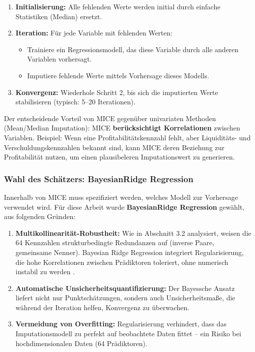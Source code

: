 \begin{enumerate}[topsep=0.2\baselineskip]
    \item \textbf{Initialisierung:} Alle fehlenden Werte werden initial durch einfache Statistiken (Median) ersetzt.
    \item \textbf{Iteration:} Für jede Variable mit fehlenden Werten:
    \begin{itemize}
        \item Trainiere ein Regressionsmodell, das diese Variable durch alle anderen Variablen vorhersagt.
        \item Imputiere fehlende Werte mittels Vorhersage dieses Modells.
    \end{itemize}
    \item \textbf{Konvergenz:} Wiederhole Schritt 2, bis sich die imputierten Werte stabilisieren (typisch: 5--20 Iterationen).
\end{enumerate}

Der entscheidende Vorteil von MICE gegenüber univariaten Methoden (Mean/Median Imputation): MICE \textbf{berücksichtigt Korrelationen} zwischen Variablen. Beispiel: Wenn eine Profitabilitätskennzahl fehlt, aber Liquiditäts- und Verschuldungskennzahlen bekannt sind, kann MICE deren Beziehung zur Profitabilität nutzen, um einen plausibeleren Imputationswert zu generieren.

\subsubsection{Wahl des Schätzers: BayesianRidge Regression}

Innerhalb von MICE muss spezifiziert werden, welches Modell zur Vorhersage verwendet wird. Für diese Arbeit wurde \textbf{BayesianRidge Regression} gewählt, aus folgenden Gründen:

\begin{enumerate}[topsep=0.2\baselineskip]
    \item \textbf{Multikollinearität-Robustheit:} Wie in Abschnitt 3.2 analysiert, weisen die 64 Kennzahlen strukturbedingte Redundanzen auf (inverse Paare, gemeinsame Nenner). Bayesian Ridge Regression integriert Regularisierung, die hohe Korrelationen zwischen Prädiktoren toleriert, ohne numerisch instabil zu werden \parencite{tipping2001sparse}.
    \item \textbf{Automatische Unsicherheitsquantifizierung:} Der Bayessche Ansatz liefert nicht nur Punktschätzungen, sondern auch Unsicherheitsmaße, die während der Iteration helfen, Konvergenz zu überwachen.
    \item \textbf{Vermeidung von Overfitting:} Regularisierung verhindert, dass das Imputationsmodell zu perfekt auf beobachtete Daten fittet – ein Risiko bei hochdimensionalen Daten (64 Prädiktoren).
\end{enumerate}

